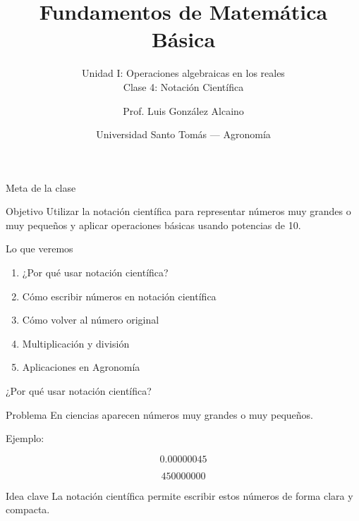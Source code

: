 \documentclass[aspectratio=169,10pt,handout]{beamer}
\title{Fundamentos de Matemática Básica}
\subtitle{Unidad I: Operaciones algebraicas en los reales\\ Clase 4: Notación Científica}
\author{Prof. Luis González Alcaino}
\date{Universidad Santo Tomás — Agronomía}
\newcommand{\pp}{\pause}
\begin{document}
	
	\begin{frame}
		\titlepage
	\end{frame}
	
	\begin{frame}{Meta de la clase}
		
		\begin{block}{Objetivo}
			Utilizar la notación científica para representar números muy grandes o muy pequeños y aplicar operaciones básicas usando potencias de 10.
		\end{block}
		
		\pp
		
		\begin{block}{Lo que veremos}
			\begin{enumerate}
				\item ¿Por qué usar notación científica?
				\item Cómo escribir números en notación científica
				\item Cómo volver al número original
				\item Multiplicación y división
				\item Aplicaciones en Agronomía
			\end{enumerate}
			
		\end{block}
		
	\end{frame}
	
	\begin{frame}{¿Por qué usar notación científica?}
		
		\begin{block}{Problema}
			En ciencias aparecen números muy grandes o muy pequeños.
		\end{block}
		
		\pp
		
		Ejemplo:
		
		\[
		0.00000045
		\]
		
		\pp
		
		\[
		450000000
		\]
		
		\pp
		
		\begin{exampleblock}{Idea clave}
			La notación científica permite escribir estos números de forma clara y compacta.
		\end{exampleblock}
		
	\end{frame}
	
\end{document}
